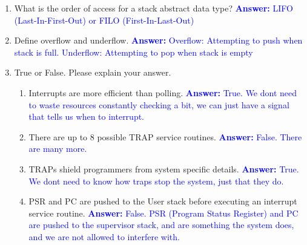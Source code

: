 \documentclass{article}
\begin{document}
\begin{enumerate}[label=(\alph*)]
    \item What is the order of access for a stack abstract data type?
    \newline
\newline
        \textcolor{blue}{\textbf{Answer: } LIFO (Last-In-First-Out) or FILO (First-In-Last-Out)}
        \newline
    \item Define overflow and underflow.
\newline
\newline
\textcolor{blue}{\textbf{Answer: }Overflow: Attempting to push when stack is full.
Underflow: Attempting to pop when stack is empty
}
        \newline
    \item True or False. Please explain your answer.
    \begin{enumerate}[label=\roman*.]
        \item Interrupts are more efficient than polling.
        \newline
        \newline
        \textcolor{blue}{\textbf{Answer:  } True. We dont need to waste resources constantly checking a bit, we can just have a signal that tells us when to interrupt. }
        \newline
        \newline
        \item There are up to 8 possible TRAP service routines.
        \newline
        \newline
        \textcolor{blue}{\textbf{Answer: } False. There are many more.}
        \newline
        \newline
        \item TRAPs shield programmers from system specific details.
        \newline \newline
        \textcolor{blue}{\textbf{Answer: }True. We dont need to know how traps stop the system, just that they do. }
        \newline
        \newline
        \item PSR and PC are pushed to the User stack before executing an interrupt service routine.
        \newline \newline
        \textcolor{blue}{\textbf{Answer: }False. PSR (Program Status Register) and PC are pushed to the supervisor stack, and are something the system does, and we are not allowed to interfere with. }

\end{enumerate}
\end{enumerate}
\end{document}
